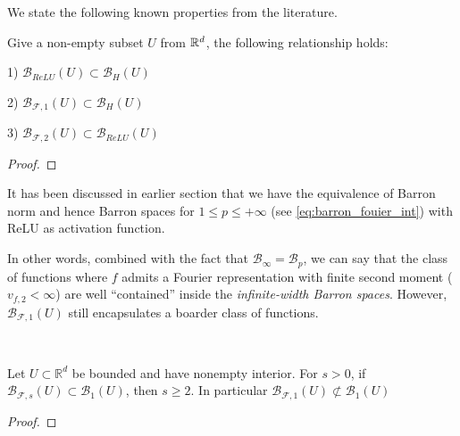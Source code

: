 We state the following known properties from the literature.

\begin{lemma}
    Give a non-empty subset $U$ from $\mathbb{R}^d$, the following relationship holds:

    1) $\mathcal{B}_{ReLU}(U) \subset \mathcal{B}_{H}(U)$

    2) $\mathcal{B}_{\mathcal{F}, 1}(U) \subset \mathcal{B}_H(U)$

    3) $\mathcal{B}_{\mathcal{F}, 2}(U) \subset \mathcal{B}_{ReLU}(U)$
\end{lemma}


\begin{proof}

\end{proof}

\begin{remark}
    It has been discussed in earlier section that we have the equivalence of
    Barron norm and hence Barron spaces for $1 \leq p\leq +\infty$ (see
    \eqref{eq:barron_fouier_int}) with ReLU as activation function.

    In other words, combined with the fact that $\mathcal{B}_{\infty} =
        \mathcal{B}_p$, we can say that the class of functions where $f$ admits
        a Fourier representation with finite second moment ($v_{f, 2} < \infty$)
        are well ``contained'' inside the \textit{infinite-width Barron spaces}.
        However, $\mathcal{B}_{\mathcal{F}, 1}(U)$ still encapsulates a boarder
        class of functions.
\end{remark}


\begin{lemma}~\cite[Proposition 7.4]{carageaNeuralNetworkApproximation2022}

    Let $U \subset \mathbb{R}^d$ be bounded and have nonempty interior. For
    $s>0$, if $\mathcal{B}_{\mathcal{F},s}(U) \subset \mathcal{B}_{1}(U)$, then
    $s \geq 2$. In particular $\mathcal{B}_{\mathcal{F},1}(U) \not\subset
        \mathcal{B}_{1}(U)$
\end{lemma}

\begin{proof}

\end{proof}




